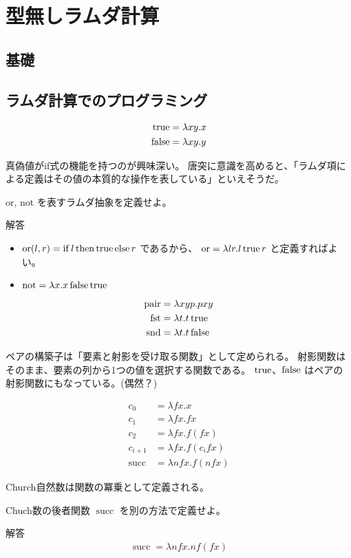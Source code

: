 \chapter{型無しラムダ計算}

\section{基礎}

\section{ラムダ計算でのプログラミング}

\begin{jdefinition}
  \begin{align*}
    \operatorname{true} & = \lambda x y. x
    \\ \operatorname{false} & = \lambda x y. y
  \end{align*}
\end{jdefinition}

真偽値がif式の機能を持つのが興味深い。
唐突に意識を高めると、「ラムダ項による定義はその値の本質的な操作を表している」といえそうだ。

\begin{jexercise*}[5.2.1]
  or, not を表すラムダ抽象を定義せよ。
\end{jexercise*}
\begin{itembox}[l]{解答}
  \begin{itemize}
    \item
      $\operatorname{or}(l, r) = \operatorname{if} l \operatorname{then} \operatorname{true} \operatorname{else} r$ であるから、
      $\operatorname{or} = \lambda l r. l \operatorname{true} r$
      と定義すればよい。
    \item
      $\operatorname{not} = \lambda x. x \operatorname{false} \operatorname{true}$
  \end{itemize}
\end{itembox}

\begin{align*}
  \operatorname{pair} & = \lambda x y p. p x y
  \\ \operatorname{fst} & = \lambda t. t \operatorname{true}
  \\ \operatorname{snd} & = \lambda t. t \operatorname{false}
\end{align*}

ペアの構築子は「要素と射影を受け取る関数」として定められる。
射影関数はそのまま、要素の列から1つの値を選択する関数である。
$\operatorname{true}$、$\operatorname{false}$ はペアの射影関数にもなっている。(偶然？)

\begin{align*}
  c_0 & = \lambda f x. x
  \\ c_1 & = \lambda f x. f x
  \\ c_2 & = \lambda f x. f (f x)
  \\ c_{i+1} & = \lambda f x. f (c_i f x)
  \\ \operatorname{succ} & = \lambda n f x. f (n f x)
\end{align*}

Church自然数は関数の冪乗として定義される。

\begin{jexercise*}[5.2.2]
  Chuch数の後者関数 $\operatorname{succ}$ を別の方法で定義せよ。
\end{jexercise*}
\begin{itembox}[l]{解答}
  \begin{align*}
    \operatorname{succ} = \lambda n f x. n f (f x)
  \end{align*}
\end{itembox}
